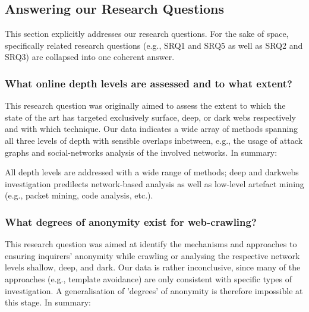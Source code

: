 \subsection{Answering our Research Questions}

This section explicitly addresses our research questions. For the sake of space, specifically related research questions (e.g., SRQ1 and SRQ5 as well as SRQ2 and SRQ3) are collapsed into one coherent answer.

\subsubsection{What online depth levels are assessed and to what extent?}

This research question was originally aimed to assess the extent to which the state of the art has targeted exclusively surface, deep, or dark webs respectively and with which technique. Our data indicates a wide array of methods spanning all three levels of depth with sensible overlaps inbetween, e.g., the usage of attack graphs and social-networks analysis of the involved networks. In summary:

\begin{framed}
All depth levels are addressed with a wide range of methods; deep and darkwebs investigation predilects network-based analysis as well as low-level artefact mining (e.g., packet mining, code analysis, etc.).
\end{framed}

\subsubsection{What degrees of anonymity exist for web-crawling?}

This research question was aimed at identify the mechanisms and approaches to ensuring inquirers' anonymity while crawling or analysing the respective network levels shallow, deep, and dark. Our data is rather inconclusive, since many of the approaches (e.g., template avoidance) are only consistent with specific types of investigation. A generalisation of 'degrees' of anonymity is therefore impossible at this stage. In summary:

